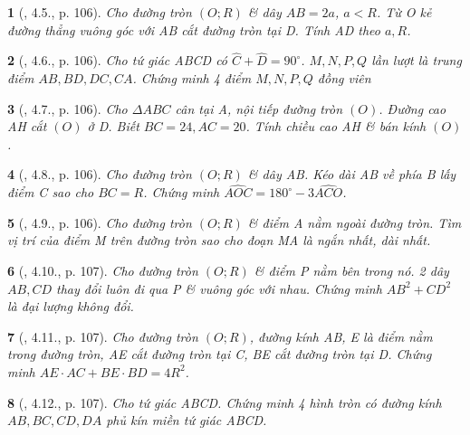 \documentclass{article}
\newtheorem{baitoan}{}
\begin{document}
\begin{baitoan}[\cite{Binh_boi_duong_Toan_9_tap_1}, 4.5., p. 106]
	Cho đường tròn $(O;R)$ \& dây $AB = 2a$, $a < R$. Từ O kẻ đường thẳng vuông góc với AB cắt đường tròn tại D. Tính AD theo $a,R$.
\end{baitoan}

\begin{baitoan}[\cite{Binh_boi_duong_Toan_9_tap_1}, 4.6., p. 106]
	Cho tứ giác ABCD có $\widehat{C} + \widehat{D} = 90^\circ$. $M,N,P,Q$ lần lượt là trung điểm $AB,BD,DC,CA$. Chứng minh 4 điểm $M,N,P,Q$ đồng viên
\end{baitoan}

\begin{baitoan}[\cite{Binh_boi_duong_Toan_9_tap_1}, 4.7., p. 106]
	Cho $\Delta ABC$ cân tại A, nội tiếp đường tròn $(O)$. Đường cao AH cắt $(O)$ ở D. Biết $BC = 24,AC = 20$. Tính chiều cao AH \& bán kính $(O)$.
\end{baitoan}

\begin{baitoan}[\cite{Binh_boi_duong_Toan_9_tap_1}, 4.8., p. 106]
	Cho đường tròn $(O;R)$ \& dây AB. Kéo dài AB về phía B lấy điểm C sao cho $BC = R$. Chứng minh $\widehat{AOC} = 180^\circ - 3\widehat{ACO}$.
\end{baitoan}

\begin{baitoan}[\cite{Binh_boi_duong_Toan_9_tap_1}, 4.9., p. 106]
	Cho đường tròn $(O;R)$ \& điểm A nằm ngoài đường tròn. Tìm vị trí của điểm M trên đường tròn sao cho đoạn MA là ngắn nhất, dài nhất.
\end{baitoan}

\begin{baitoan}[\cite{Binh_boi_duong_Toan_9_tap_1}, 4.10., p. 107]
	Cho đường tròn $(O;R)$ \& điểm P nằm bên trong nó. 2 dây $AB,CD$ thay đổi luôn đi qua P \& vuông góc với nhau. Chứng minh $AB^2 + CD^2$ là đại lượng không đổi.
\end{baitoan}

\begin{baitoan}[\cite{Binh_boi_duong_Toan_9_tap_1}, 4.11., p. 107]
	Cho đường tròn $(O;R)$, đường kính AB, E là điểm nằm trong đường tròn, AE cắt đường tròn tại C, BE cắt đường tròn tại D. Chứng minh $AE\cdot AC + BE\cdot BD = 4R^2$.
\end{baitoan}

\begin{baitoan}[\cite{Binh_boi_duong_Toan_9_tap_1}, 4.12., p. 107]
	Cho tứ giác ABCD. Chứng minh 4 hình tròn có đường kính $AB,BC,CD,DA$ phủ kín miền tứ giác ABCD.
\end{baitoan}
\end{document}
